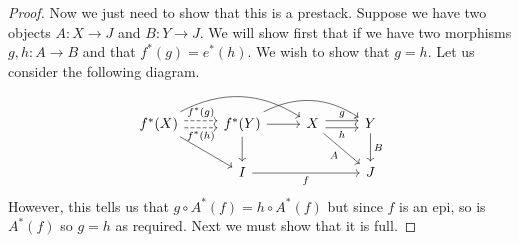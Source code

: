 \begin{proof}
  Now we just need to show that this is a prestack. Suppose we have
  two objects $A : X \to J$ and $B : Y \to J$. We will show first that
  if we have two morphisms $g, h : A \to B$ and that
  $f^*(g) = e^*(h)$. We wish to show that $g = h$. Let us consider the
  following diagram.
  \[
    \begin{tikzcd}
      f^*(X) \ar[dr] \ar[rr, bend left] \ar[r, dashed, shift left=.25em, "f^*(g)"] \ar[r, dashed, swap, shift right=.25em, "f^*(h)"] &
      f^*(Y) \ar[d] \ar[r] \ar[bend left, rr] &
      X \ar[dr, swap, "A"] \ar[r, shift left=.25em, "g"] \ar[r, shift right=.25em, swap, "h"] &
      Y \ar[d, "B"]\\
      & I \ar[rr, swap, "f"] & & J
    \end{tikzcd}
  \]
  However, this tells us that $g \circ A^*(f) = h \circ A^*(f)$ but
  since $f$ is an epi, so is $A^*(f)$ so $g = h$ as required. Next we
  must show that it is full.


\end{proof}
